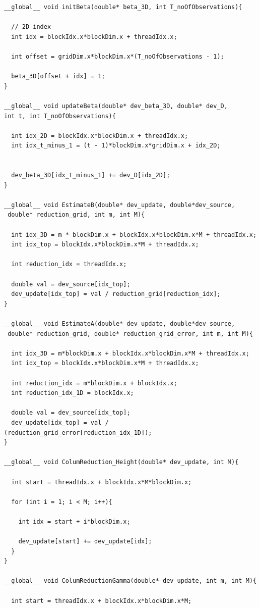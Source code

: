\documentclass[english, paper=a4]{scrartcl}
\begin{document}
\begin{verbatim}
__global__ void initBeta(double* beta_3D, int T_noOfObservations){

  // 2D index
  int idx = blockIdx.x*blockDim.x + threadIdx.x;

  int offset = gridDim.x*blockDim.x*(T_noOfObservations - 1);

  beta_3D[offset + idx] = 1;
}

__global__ void updateBeta(double* dev_beta_3D, double* dev_D, 
int t, int T_noOfObservations){

  int idx_2D = blockIdx.x*blockDim.x + threadIdx.x;
  int idx_t_minus_1 = (t - 1)*blockDim.x*gridDim.x + idx_2D;


  dev_beta_3D[idx_t_minus_1] += dev_D[idx_2D];
}

__global__ void EstimateB(double* dev_update, double*dev_source,
 double* reduction_grid, int m, int M){

  int idx_3D = m * blockDim.x + blockIdx.x*blockDim.x*M + threadIdx.x;
  int idx_top = blockIdx.x*blockDim.x*M + threadIdx.x;

  int reduction_idx = threadIdx.x;

  double val = dev_source[idx_top];
  dev_update[idx_top] = val / reduction_grid[reduction_idx];
}

__global__ void EstimateA(double* dev_update, double*dev_source,
 double* reduction_grid, double* reduction_grid_error, int m, int M){

  int idx_3D = m*blockDim.x + blockIdx.x*blockDim.x*M + threadIdx.x;
  int idx_top = blockIdx.x*blockDim.x*M + threadIdx.x;

  int reduction_idx = m*blockDim.x + blockIdx.x;
  int reduction_idx_1D = blockIdx.x;

  double val = dev_source[idx_top];
  dev_update[idx_top] = val / (reduction_grid_error[reduction_idx_1D]);
}

__global__ void ColumReduction_Height(double* dev_update, int M){

  int start = threadIdx.x + blockIdx.x*M*blockDim.x;

  for (int i = 1; i < M; i++){

    int idx = start + i*blockDim.x;

    dev_update[start] += dev_update[idx];
  }
}

__global__ void ColumReductionGamma(double* dev_update, int m, int M){

  int start = threadIdx.x + blockIdx.x*blockDim.x*M;


\end{verbatim}
\end{document}

